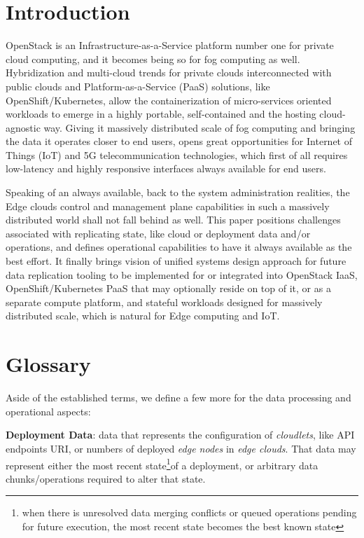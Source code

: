 \documentclass[conference]{IEEEtran}
\begin{document}
\section{Introduction}

OpenStack is an Infrastructure-as-a-Service platform number one for private
cloud computing, and it becomes being so for fog computing as well.
Hybridization and multi-cloud trends for private clouds interconnected with
public clouds and Platform-as-a-Service (PaaS) solutions, like
OpenShift/Kubernetes, allow the containerization of micro-services oriented
workloads to emerge in a highly portable, self-contained and the hosting
cloud-agnostic way. Giving it massively distributed scale of fog computing and
bringing the data it operates closer to end users, opens great opportunities
for Internet of Things (IoT) and 5G telecommunication technologies,
which first of all requires low-latency and highly responsive interfaces always
available for end users.

Speaking of an always available, back to the system administration realities,
the Edge clouds control and management plane capabilities in such a massively
distributed world shall not fall behind as well. This paper positions
challenges associated with replicating state, like cloud or deployment data
and/or operations, and defines operational capabilities to have it always
available as the best effort. It finally brings vision of unified systems
design approach for future data replication tooling to be implemented for or
integrated into OpenStack IaaS, OpenShift/Kubernetes PaaS that may optionally
reside on top of it, or as a separate compute platform, and stateful workloads
designed for massively distributed scale, which is natural for Edge computing
and IoT.

\section{Glossary}

Aside of the established terms\cite{b3}, we define a few more for the data
processing and operational aspects:

\textbf{Deployment Data}: data that represents the configuration of
\textit{cloudlets}\cite{b3}, like API endpoints URI, or numbers of deployed
\textit{edge nodes}\cite{b3} in \textit{edge clouds}\cite{b3}. That data may
represent either the most recent state\footnote{when there is unresolved data
merging conflicts or queued operations pending for future execution, the most
recent state becomes the best known state}of a deployment, or arbitrary data
chunks/operations required to alter that state.
\end{document}
